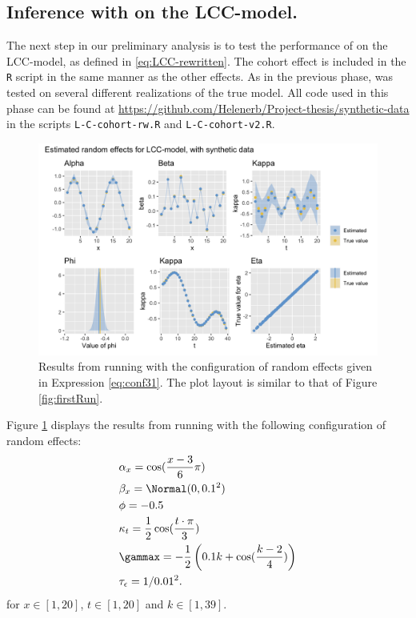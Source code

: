 \subsection{Inference with \inlabru on the LCC-model. }
The next step in our preliminary analysis is to test the performance of \inlabru on the LCC-model, as defined in \ref{eq:LCC-rewritten}. The cohort effect is included in the \texttt{R} script in the same manner as the other effects. As in the previous phase, \inlabru was tested on several different realizations of the true model. All code used in this phase can be found at \url{https://github.com/Helenerb/Project-thesis/synthetic-data} in the scripts \texttt{L-C-cohort-rw.R} and \texttt{L-C-cohort-v2.R}.
\begin{figure}[h!]
    \centering
    \includegraphics[width=0.85\linewidth]{synthetic-data/Figures/effects-LCC-synthetic-3-1.png}
    \caption{Results from running \inlabru with the configuration of random effects given in Expression \ref{eq:conf31}. The plot layout is similar to that of Figure \ref{fig:firstRun}.}
    \label{fig:conf31}
\end{figure}
Figure \ref{fig:conf31} displays the results from running \inlabru with the following configuration of random effects:
\begin{equation}
    \begin{aligned}
        &\alpha_x = \cos(\frac{x-3}{6}\pi)\\
        &\beta_x = \Normal(0,0.1^2)\\
        &\phi = -0.5\\
        &\kappa_t = \frac{1}{2}\cos(\frac{t\cdot \pi}{3})\\
        &\gammax = -\frac{1}{2}\left( 0.1k + \cos(\frac{k-2}{4})\right)\\
        &\tau_{\epsilon} = 1/0.01^2.
    \end{aligned}
    \label{eq:conf31}
\end{equation}
for $x\in[1,20]$, $t \in [1,20]$ and $k \in [1,39]$. 

